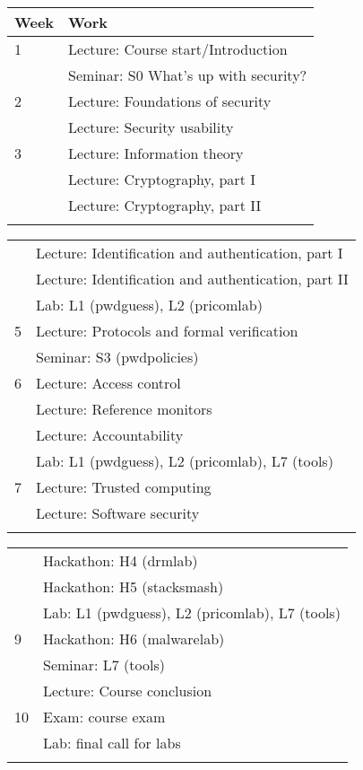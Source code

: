 	\centering
  \begin{tabular}{lp{9cm}}
    \toprule
    \textbf{Week}	& \textbf{Work} \\
    \midrule
    1
    & Lecture: Course start/Introduction\\
    & Seminar: S0 What's up with security?\\
    \midrule
    2
    & Lecture: Foundations of security\\
    & Lecture: Security usability\\
    \midrule
    3
    & Lecture: Information theory\\
    & Lecture: Cryptography, part I\\
    & Lecture: Cryptography, part II\\
    \midrule
\mode<presentation>{%
  \end{tabular}
  \begin{tabular}{lp{9cm}}
}%
    4
    & Lecture: Identification and authentication, part I\\
    & Lecture: Identification and authentication, part II\\
    & Lab: L1 (pwdguess), L2 (pricomlab)\\
    \midrule
    5
    & Lecture: Protocols and formal verification\\
    & Seminar: S3 (pwdpolicies)\\
    \midrule
    6
    & Lecture: Access control\\
    & Lecture: Reference monitors\\
    & Lecture: Accountability\\
    & Lab: L1 (pwdguess), L2 (pricomlab), L7 (tools)\\
    \midrule
    7
    & Lecture: Trusted computing\\
    & Lecture: Software security\\
    \midrule
\mode<presentation>{%
  \end{tabular}
  \begin{tabular}{lp{9cm}}
}%
    8
    & Hackathon: H4 (drmlab)\\
    & Hackathon: H5 (stacksmash)\\
    & Lab: L1 (pwdguess), L2 (pricomlab), L7 (tools)\\
    \midrule
    9
    & Hackathon: H6 (malwarelab)\\
    & Seminar: L7 (tools)\\
    & Lecture: Course conclusion\\
    \midrule
    10
    & Exam: course exam\\
    & Lab: final call for labs\\
    \midrule
\mode<presentation>{%
  \end{tabular}
